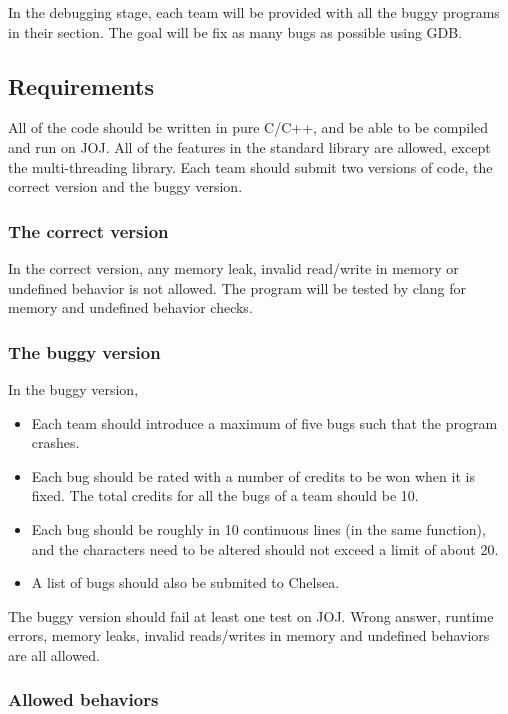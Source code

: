 \documentclass[11pt,a4paper]{article}
\begin{document}
In the debugging stage, each team will be provided with all the buggy programs in their section. The goal will be fix as many bugs as possible using GDB.

\subsection{Requirements}

All of the code should be written in pure C/C++, and be able to be compiled and run on JOJ. All of the features in the standard library are allowed, except the multi-threading library. Each team should submit two versions of code, the correct version and the buggy version. \medskip

\subsubsection{The correct version}

In the correct version, any memory leak, invalid read/write in memory or undefined behavior is not allowed. The program will be tested by clang for memory and undefined behavior checks.  \medskip


\subsubsection{The buggy version}

In the buggy version,

\begin{itemize}
  \item Each team should introduce a maximum of five bugs such that the program crashes.
  \item Each bug should be rated with a number of
        credits to be won when it is fixed. The total credits for all the bugs of a team should be 10.
  \item Each bug should be roughly in 10 continuous lines (in the same function), and the characters need to be altered should not exceed a limit of about 20.
  \item A list of bugs should also be submited to Chelsea.
\end{itemize}

The buggy version should fail at least one test on JOJ. Wrong answer, runtime errors, memory leaks, invalid reads/writes in memory and undefined behaviors are all allowed.

\subsubsection{Allowed behaviors}
\end{document}
